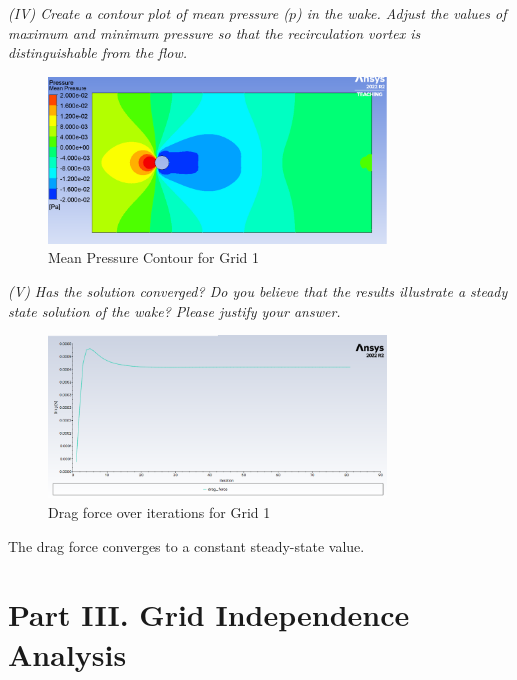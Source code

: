 \textit{(IV) Create a contour plot of mean pressure ($p$) in the wake. Adjust the values of maximum and minimum pressure so that the recirculation vortex is distinguishable from the flow.}
\begin{figure}[H]
    \centering
    \includegraphics[width=0.8\textwidth]{Questions/Figures/mean pressure grid 1.png}
    \caption{Mean Pressure Contour for Grid 1}
\end{figure}

\textit{(V) Has the solution converged? Do you believe that the results illustrate a steady state solution of the wake? Please justify your answer.}
\begin{figure}[H]
    \centering
    \includegraphics[width=0.8\textwidth]{Questions/Figures/drag force grid 1.png}
    \caption{Drag force over iterations for Grid 1}
\end{figure}
The drag force converges to a constant steady-state value. 

\section*{Part III. Grid Independence Analysis}

